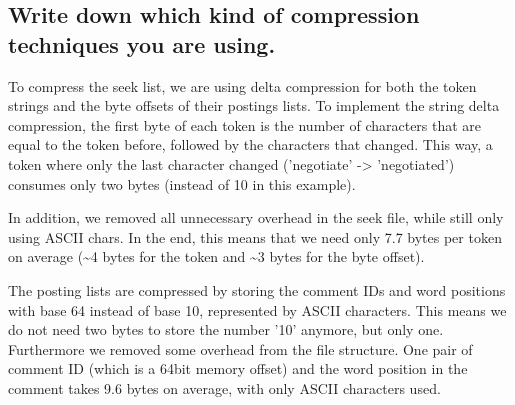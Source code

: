 \documentclass{scrartcl}
\begin{document}
\subsection{Write down which kind of compression techniques you are using.}

To compress the seek list, we are using delta compression for both the token strings and the byte offsets of their postings lists. To implement the string delta compression, the first byte of each token is the number of characters that are equal to the token before, followed by the characters that changed. This way, a token where only the last character changed ('negotiate' -> 'negotiated') consumes only two bytes (instead of 10 in this example).

In addition, we removed all unnecessary overhead in the seek file, while still only using ASCII chars. In the end, this means that we need only 7.7 bytes per token on average (\textasciitilde4 bytes for the token and \textasciitilde3 bytes for the byte offset).

The posting lists are compressed by storing the comment IDs and word positions with base 64 instead of base 10, represented by ASCII characters. This means we do not need two bytes to store the number '10' anymore, but only one. Furthermore we removed some overhead from the file structure. One pair of comment ID (which is a 64bit memory offset) and the word position in the comment takes 9.6 bytes on average, with only ASCII characters used.
\end{document}
